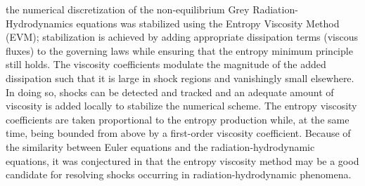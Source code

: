 \documentclass[times,doublespace]{fldauth}%
\begin{document}
the numerical discretization of the non-equilibrium Grey Radiation-Hydrodynamics 
equations was stabilized using the Entropy Viscosity Method (EVM); 
stabilization is achieved by adding appropriate dissipation terms (viscous fluxes) to the governing laws while ensuring 
that the entropy minimum principle still holds. 
The viscosity coefficients modulate the magnitude of the added dissipation such that it is large in shock regions 
and vanishingly small elsewhere. In doing so, shocks can be detected and tracked and an adequate amount of viscosity 
is added locally to stabilize the numerical scheme. 
The entropy viscosity coefficients are taken proportional to the entropy production while, at the same time, 
being bounded from above by a first-order viscosity coefficient.
Because of the similarity between Euler equations and the radiation-hydrodynamic equations, it was conjectured in 
\cite{our_jcp_radhy_paper} that the entropy 
viscosity method may be a good candidate for resolving shocks occurring in radiation-hydrodynamic phenomena.
\end{document}
